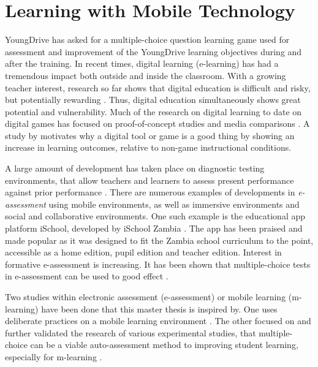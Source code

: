 \section{Learning with Mobile Technology}

    YoungDrive has asked for a multiple-choice question learning game used for assessment and improvement of the YoungDrive learning objectives during and after the training. In recent times, digital learning (e-learning) has had a tremendous impact both outside and inside the classroom. With a growing teacher interest, research so far shows that digital education is difficult and risky, but potentially rewarding \citep{luckin}. Thus, digital education simultaneously shows great potential and vulnerability. Much of the research on digital learning to date on digital games has focused on proof-of-concept studies and media comparisons \citep{luckin}. A study by \cite{gates} motivates why a digital tool or game is a good thing by showing an increase in learning outcomes, relative to non-game instructional conditions.


    A large amount of development has taken place on diagnostic testing environments, that allow teachers and learners to assess present performance against prior performance \citep{luckin}. There are numerous examples of developments in \textit{e-assessment} using mobile environments, as well as immersive environments and social and collaborative environments. One such example is the educational app platform iSchool, developed by iSchool Zambia \citep{ischool}. The app has been praised and made popular as it was designed to fit the Zambia school curriculum to the point, accessible as a home edition, pupil edition and teacher edition. Interest in formative e-assessment is increasing.  It has been shown that multiple-choice tests in e-assessment can be used to good effect \citep{nicol}.

    Two studies within electronic assessment (e-assessment) or mobile learning (m-learning) have been done that this master thesis is inspired by. One uses deliberate practices on a mobile learning environment \citep{yengin}. The other focused on and further validated the research of various experimental studies, that multiple-choice can be a viable auto-assessment method to improving student learning, especially for m-learning \citep{de-marcos}.

